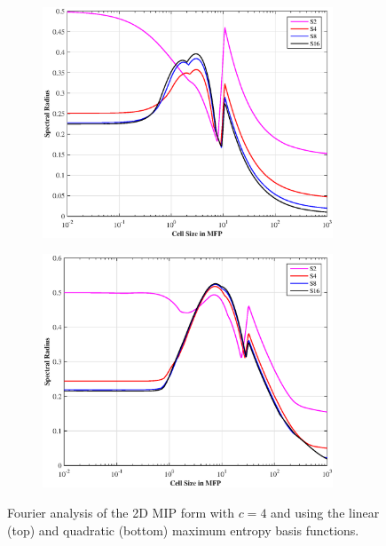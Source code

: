 \begin{figure}
\centering
	\begin{subfigure}[b]{0.80\textwidth}
		\centering
		\includegraphics[width=0.95\textwidth]{figures/sec_DSA/SI_MIP_quad_C=4_MAXENT1_LS.eps}
	\end{subfigure}
	\vfill
	\begin{subfigure}[b]{0.80\textwidth}
		\centering
		\includegraphics[width=0.95\textwidth]{figures/sec_DSA/SI_MIP_quad_C=4_UMAXENT2_LS.eps}
	\end{subfigure}
\caption{Fourier analysis of the 2D MIP form with $c=4$ and using the linear (top) and quadratic (bottom) maximum entropy basis functions.}
\label{fig::DSA_2D1G_Fourier_ME}
\end{figure}

